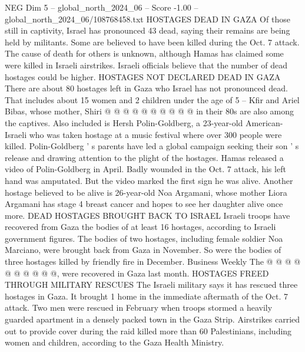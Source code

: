 \begin{textsample}{NEG Dim 5 – global\_north\_2024\_06 – Score -1.00 – global\_north\_2024\_06/108768458.txt}
HOSTAGES DEAD IN GAZA Of those still in captivity, Israel has pronounced 43 dead, saying their remains are being held by militants.
Some are believed to have been killed during the Oct. 7 attack.
The cause of death for others is unknown, although Hamas has claimed some were killed in Israeli airstrikes.
Israeli officials believe that the number of dead hostages could be higher.
HOSTAGES NOT DECLARED DEAD IN GAZA There are about 80 hostages left in Gaza who Israel has not pronounced dead.
That includes about 15 women and 2 children under the age of 5 -- Kfir and Ariel Bibas, whose mother, Shiri @ @ @ @ @ @ @ @ @ @ in their 80s are also among the captives.
Also included is Hersh Polin-Goldberg, a 23-year-old American-Israeli who was taken hostage at a music festival where over 300 people were killed.
Polin-Goldberg ' s parents have led a global campaign seeking their son ' s release and drawing attention to the plight of the hostages.
Hamas released a video of Polin-Goldberg in April.
Badly wounded in the Oct. 7 attack, his left hand was amputated.
But the video marked the first sign he was alive.
Another hostage believed to be alive is 26-year-old Noa Argamani, whose mother Liora Argamani has stage 4 breast cancer and hopes to see her daughter alive once more.
DEAD HOSTAGES BROUGHT BACK TO ISRAEL Israeli troops have recovered from Gaza the bodies of at least 16 hostages, according to Israeli government figures.
The bodies of two hostages, including female soldier Noa Marciano, were brought back from Gaza in November.
So were the bodies of three hostages killed by friendly fire in December.
Business Weekly The @ @ @ @ @ @ @ @ @ @, were recovered in Gaza last month.
HOSTAGES FREED THROUGH MILITARY RESCUES The Israeli military says it has rescued three hostages in Gaza.
It brought 1 home in the immediate aftermath of the Oct. 7 attack.
Two men were rescued in February when troops stormed a heavily guarded apartment in a densely packed town in the Gaza Strip.
Airstrikes carried out to provide cover during the raid killed more than 60 Palestinians, including women and children, according to the Gaza Health Ministry.

\end{textsample}
